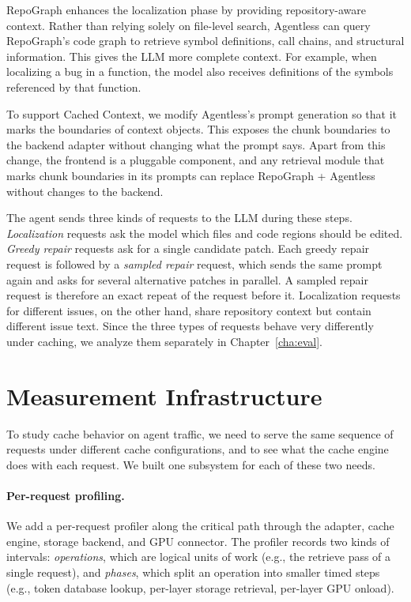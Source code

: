 RepoGraph enhances the localization phase by providing repository-aware context. Rather than relying solely on file-level search, Agentless can query RepoGraph's code graph to retrieve symbol definitions, call chains, and structural information. This gives the LLM more complete context. For example, when localizing a bug in a function, the model also receives definitions of the symbols referenced by that function.

To support Cached Context, we modify Agentless's prompt generation so that it marks the boundaries of context objects. This exposes the chunk boundaries to the backend adapter without changing what the prompt says. Apart from this change, the frontend is a pluggable component, and any retrieval module that marks chunk boundaries in its prompts can replace RepoGraph + Agentless without changes to the backend.

The agent sends three kinds of requests to the LLM during these steps. \emph{Localization} requests ask the model which files and code regions should be edited. \emph{Greedy repair} requests ask for a single candidate patch. Each greedy repair request is followed by a \emph{sampled repair} request, which sends the same prompt again and asks for several alternative patches in parallel. A sampled repair request is therefore an exact repeat of the request before it. Localization requests for different issues, on the other hand, share repository context but contain different issue text. Since the three types of requests behave very differently under caching, we analyze them separately in Chapter~\ref{cha:eval}.

\section{Measurement Infrastructure}
\label{sec:profiling}
\label{sec:request_logging}

To study cache behavior on agent traffic, we need to serve the same sequence of requests under different cache configurations, and to see what the cache engine does with each request. We built one subsystem for each of these two needs.

\paragraph{Per-request profiling.}
We add a per-request profiler along the critical path through the adapter, cache engine, storage backend, and GPU connector. The profiler records two kinds of intervals: \emph{operations}, which are logical units of work (e.g., the retrieve pass of a single request), and \emph{phases}, which split an operation into smaller timed steps (e.g., token database lookup, per-layer storage retrieval, per-layer GPU onload).

